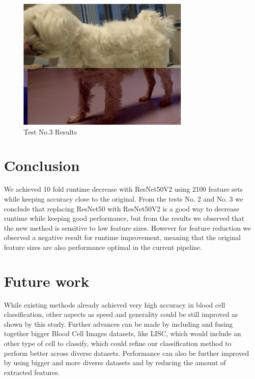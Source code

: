 \documentclass[conference]{IEEEtran}
\begin{document}
\begin{figure}[htbp]
    \begin{center}
    \includegraphics[scale=0.4]{test1.png}
    \end{center}
    \caption{Test No.3 Results}
    \label{test1}
\end{figure}

\section{Conclusion}

We achieved 10 fold runtime decrease with ResNet50V2 using 2100 feature sets while keeping accuracy close to the original.
From the tests No. 2 and No. 3 we conclude that replacing ResNet50 with ResNet50V2 is a good way to decrease runtime while keeping good performance, but from the results we observed that the new method is sensitive to low feature sizes.
However for feature reduction we observed a negative result for runtime improvement, meaning that the original feature sizes are also performance optimal in the current pipeline.

\section{Future work}

While existing methods already achieved very high accuracy in blood cell classification, other aspects as speed and generality could be still improved as shown by this study. 
Further advances can be made by including and fusing together bigger Blood Cell Images datasets, like LISC, which would include an other type of cell to classify, which could refine our classification method to perform better across diverse datasets.
Performance can also be further improved by using bigger and more diverse datasets and by reducing the
amount of extracted features.
\end{document}
